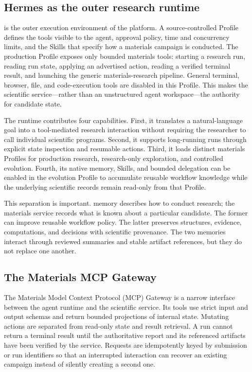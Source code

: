 \subsection{Hermes as the outer research runtime}

\hermes is the outer execution environment of the platform.  A source-controlled \hermes Profile defines the tools visible to the agent, approval policy, time and concurrency limits, and the Skills that specify how a materials campaign is conducted.  The production Profile exposes only bounded materials tools: starting a research run, reading run state, applying an advertised action, reading a verified terminal result, and launching the generic materials-research pipeline.  General terminal, browser, file, and code-execution tools are disabled in this Profile.  This makes the scientific service---rather than an unstructured agent workspace---the authority for candidate state.

The runtime contributes four capabilities.  First, it translates a natural-language goal into a tool-mediated research interaction without requiring the researcher to call individual scientific programs.  Second, it supports long-running runs through explicit state inspection and resumable actions.  Third, it loads distinct materials Profiles for production research, research-only exploration, and controlled evolution.  Fourth, its native memory, Skills, and bounded delegation can be enabled in the evolution Profile to accumulate reusable workflow knowledge while the underlying scientific records remain read-only from that Profile.

This separation is important.  \hermes memory describes how to conduct research; the materials service records what is known about a particular candidate.  The former can improve reusable workflow policy.  The latter preserves structures, evidence, computations, and decisions with scientific provenance.  The two memories interact through reviewed summaries and stable artifact references, but they do not replace one another.

\subsection{The Materials MCP Gateway}

The Materials Model Context Protocol (MCP) Gateway is a narrow interface between the agent runtime and the scientific service.  Its tools use strict input and output schemas and return bounded projections of internal state.  Mutating actions are separated from read-only state and result retrieval.  A run cannot return a terminal result until the authoritative report and its referenced artifacts have been verified by the service.  Requests are idempotently keyed by submission or run identifiers so that an interrupted \hermes interaction can recover an existing campaign instead of silently creating a second one.

